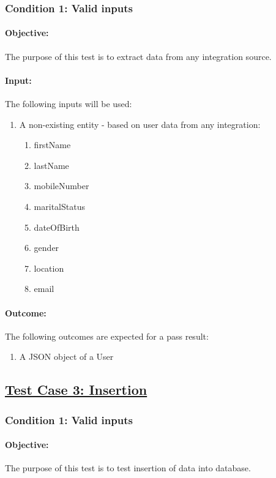 \documentclass{article}
\begin{document}
\subsubsection{Condition 1: Valid inputs }
\paragraph{Objective:} The purpose of this test is to extract data from any integration source.
\paragraph{Input:} The following inputs will be used:
\begin{enumerate}
	\item A non-existing entity - based on user data from any integration:
	\begin{enumerate}
		\item firstName
  		\item lastName
  		\item mobileNumber 
  		\item maritalStatus 
  		\item dateOfBirth 
 		\item gender
  		\item location 
 		\item email	
	\end{enumerate}
\end{enumerate}
\paragraph{Outcome:} The following outcomes are expected for a pass result:
\begin{enumerate}
	\item A JSON object of a User 
\end{enumerate}

\pagebreak

\subsection{\underline{Test Case 3: Insertion}}\label{test3}
\subsubsection{Condition 1: Valid inputs }
\paragraph{Objective:} The purpose of this test is to test insertion of data into database.
\end{document}
